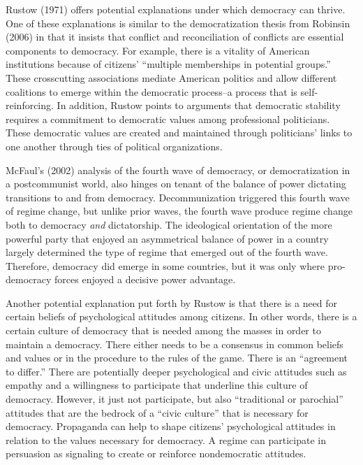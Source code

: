 \documentclass[12pt,]{article}
\begin{document}
Rustow (1971) offers potential explanations under which democracy can
thrive. One of these explanations is similar to the democratization
thesis from Robinsin (2006) in that it insists that conflict and
reconciliation of conflicts are essential components to democracy. For
example, there is a vitality of American institutions because of
citizens' ``multiple memberships in potential groups.'' These
crosscutting associations mediate American politics and allow different
coalitions to emerge within the democratic process--a process that is
self-reinforcing. In addition, Rustow points to arguments that
democratic stability requires a commitment to democratic values among
professional politicians. These democratic values are created and
maintained through politicians' links to one another through ties of
political organizations.

McFaul's (2002) analysis of the fourth wave of democracy, or
democratization in a postcommunist world, also hinges on tenant of the
balance of power dictating transitions to and from democracy.
Decommunization triggered this fourth wave of regime change, but unlike
prior waves, the fourth wave produce regime change both to democracy
\emph{and} dictatorship. The ideological orientation of the more
powerful party that enjoyed an asymmetrical balance of power in a
country largely determined the type of regime that emerged out of the
fourth wave. Therefore, democracy did emerge in some countries, but it
was only where pro-democracy forces enjoyed a decisive power advantage.

Another potential explanation put forth by Rustow is that there is a
need for certain beliefs of psychological attitudes among citizens. In
other words, there is a certain culture of democracy that is needed
among the masses in order to maintain a democracy. There either needs to
be a consensus in common beliefs and values or in the procedure to the
rules of the game. There is an ``agreement to differ.'' There are
potentially deeper psychological and civic attitudes such as empathy and
a willingness to participate that underline this culture of democracy.
However, it just not participate, but also ``traditional or parochial''
attitudes that are the bedrock of a ``civic culture'' that is necessary
for democracy. Propaganda can help to shape citizens' psychological
attitudes in relation to the values necessary for democracy. A regime
can participate in persuasion as signaling to create or reinforce
nondemocratic attitudes.
\end{document}
